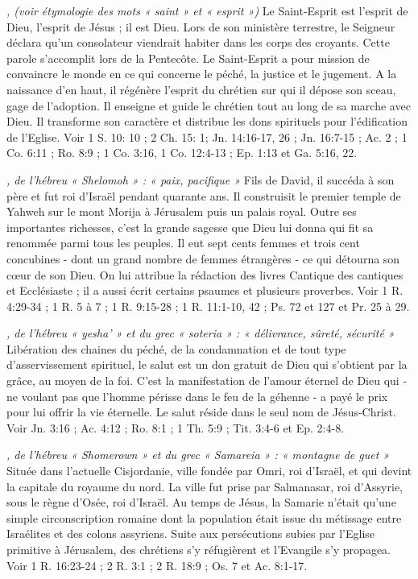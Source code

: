 \begin{multicols}{2}
{\textit{, (voir étymologie des mots « saint » et « esprit »)}\newline
Le Saint-Esprit est l'esprit de Dieu, l'esprit de Jésus ; il est Dieu. Lors de son ministère terrestre, le Seigneur déclara qu'un consolateur viendrait habiter dans les corps des croyants. Cette parole s'accomplit lors de la Pentecôte. Le Saint-Esprit a pour mission de convaincre le monde en ce qui concerne le péché, la justice et le jugement. A la naissance d'en haut, il régénère l'esprit du chrétien sur qui il dépose son sceau, gage de l'adoption. Il enseigne et guide le chrétien tout au long de sa marche avec Dieu. Il transforme son caractère et distribue les dons spirituels pour l'édification de l'Eglise. Voir 1 S. 10: 10 ; 2 Ch. 15: 1; Jn. 14:16-17, 26 ; Jn. 16:7-15 ; Ac. 2 ; 1 Co. 6:11 ; Ro. 8:9 ; 1 Co. 3:16, 1 Co. 12:4-13 ; Ep. 1:13 et Ga. 5:16, 22.

\textit{, de l'hébreu « Shelomoh » : « paix, pacifique »}\newline
Fils de David, il succéda à son père et fut roi d'Israël pendant quarante ans. Il construisit le premier temple de Yahweh sur le mont Morija à Jérusalem puis un palais royal. Outre ses importantes richesses, c'est la grande sagesse que Dieu lui donna qui fit sa renommée parmi tous les peuples. Il eut sept cents femmes et trois cent concubines - dont un grand nombre de femmes étrangères - ce qui détourna son cœur de son Dieu. On lui attribue la rédaction des livres Cantique des cantiques et Ecclésiaste ; il a aussi écrit certains psaumes et plusieurs proverbes. Voir 1 R. 4:29-34 ; 1 R. 5 à 7 ; 1 R. 9:15-28 ; 1 R. 11:1-10, 42 ; Ps. 72 et 127 et Pr. 25 à 29.

\textit{, de l'hébreu « yesha' » et du grec « soteria » : « délivrance, sûreté, sécurité »}\newline
Libération des chaines du péché, de la condamnation et de tout type d'asservissement spirituel, le salut est un don gratuit de Dieu qui s'obtient par la grâce, au moyen de la foi. C'est la manifestation de l'amour éternel de Dieu qui - ne voulant pas que l'homme périsse dans le feu de la géhenne - a payé le prix pour lui offrir la vie éternelle. Le salut réside dans le seul nom de Jésus-Christ. Voir Jn. 3:16 ; Ac. 4:12 ; Ro. 8:1 ; 1 Th. 5:9 ; Tit. 3:4-6 et Ep. 2:4-8.

\textit{, de l'hébreu « Shomerown » et du grec « Samareia » : « montagne de guet »}\newline
Située dans l'actuelle Cisjordanie, ville fondée par Omri, roi d'Israël, et qui devint la capitale du royaume du nord. La ville fut prise par Salmanasar, roi d'Assyrie, sous le règne d'Osée, roi d'Israël. Au temps de Jésus, la Samarie n'était qu'une simple circonscription romaine dont la population était issue du métissage entre Israélites et des colons assyriens. Suite aux persécutions subies par l'Eglise primitive à Jérusalem, des chrétiens s'y réfugièrent et l'Evangile s'y propagea. Voir 1 R. 16:23-24 ; 2 R. 3:1 ; 2 R. 18:9 ; Os. 7 et Ac. 8:1-17.

}
\end{multicols}
